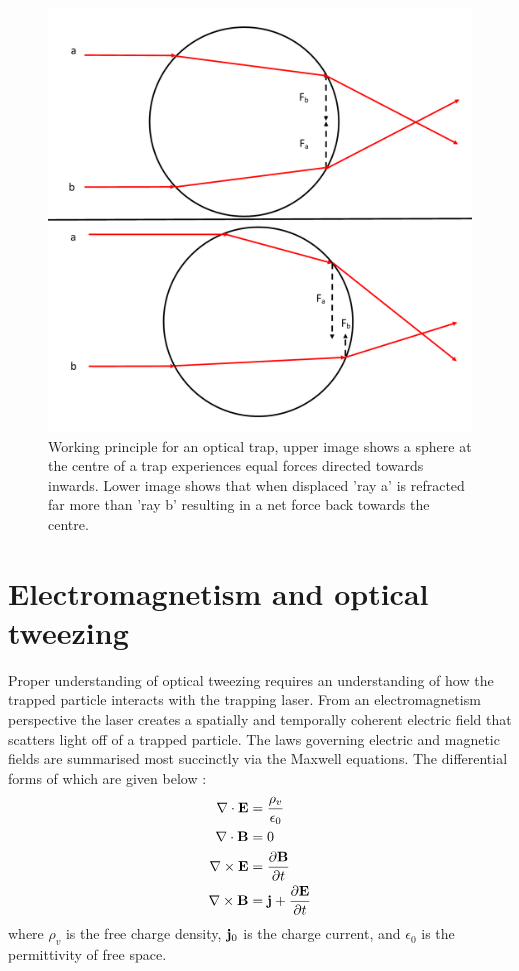 \begin{figure}[h!]
  \centering
  \includegraphics[width=0.65\linewidth]{ot_working_principal.png}
  \caption{Working principle for an optical trap, upper image shows a sphere at the centre of a trap experiences equal forces directed towards inwards. Lower image shows that when displaced 'ray a' is refracted far more than 'ray b' resulting in a net force back towards the centre.}
  \label{fig:working_principle}
\end{figure}


\section{Electromagnetism and optical tweezing}

Proper understanding of optical tweezing requires an understanding of
how the trapped particle interacts with the trapping laser. From an 
electromagnetism perspective the laser creates a spatially and 
temporally coherent electric field that scatters light off of a 
trapped particle.  The laws governing electric and magnetic fields 
are summarised most succinctly via the Maxwell equations. The 
differential forms of which are given below \cite{Jackson_1975}:
\begin{align}
  \nabla \cdot \mathbf{E}
  &= \frac{\rho_ v}{\epsilon_0}
  \\
  \nabla \cdot \mathbf{B}
  &= 0
  \\
  \nabla \times \mathbf{E}
  &= \frac{\partial \mathbf{B}}{\partial t}
  \\
  \nabla \times \mathbf{B}
  &= {\bf j} +\frac{\partial \mathbf{E}}{\partial t}    
\end{align}
where $\rho_v$ is the free charge density, ${\bf j}_0$ is the charge
current, and $\epsilon_0$ is the permittivity of free space. 

